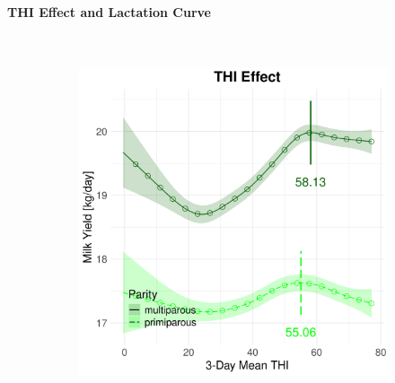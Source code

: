 \newpage
\paragraph{THI Effect and Lactation Curve} \quad \\
\begin{figure}[H]
    \centering
    \begin{subfigure}[b]{0.45\textwidth}
        \centering
        \includegraphics[width=\textwidth]{thesis/figures/models/milk/after2010/je_milk_after2010/je_milk_after2010_marginal_thi_milk_combined.png}
    \end{subfigure}
    \hspace{0.05\textwidth} %
    \begin{subfigure}[b]{0.45\textwidth}
        \centering

\end{subfigure}
\end{figure}
